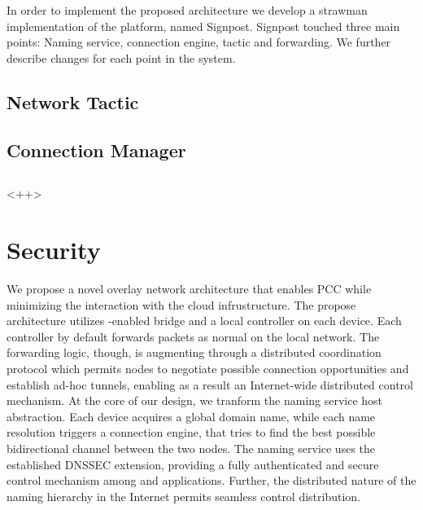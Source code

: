 In order to implement the proposed architecture we develop a strawman
implementation of the platform, named Signpost. Signpost touched three main
points: Naming service, connection engine, tactic and forwarding. We further
describe changes for each point in the system. 

\subsection{Network Tactic}

\subsection{Connection Manager}

\subsection{}<++>

\section{Security}




We propose a novel overlay network architecture that enables PCC while
minimizing the interaction with the cloud infrustructure. 
The propose architecture utilizes \of-enabled bridge and a
local controller on each device. Each controller by default forwards packets as
normal on the local network. The forwarding logic, though,  is augmenting
through a distributed coordination protocol which permits nodes to negotiate
possible connection opportunities and establish ad-hoc tunnels, enabling as a
result an Internet-wide distributed control mechanism. At the core of
our design, we tranform the naming service host abstraction. Each device
acquires a global domain name, while each name resolution triggers a connection
engine, that tries to find the best possible bidirectional channel between the
two nodes. The naming service uses the established
DNSSEC extension, providing a fully authenticated and secure control
mechanism among \signpost and applications. Further, the distributed nature
of the naming hierarchy in the Internet permits seamless control distribution.

